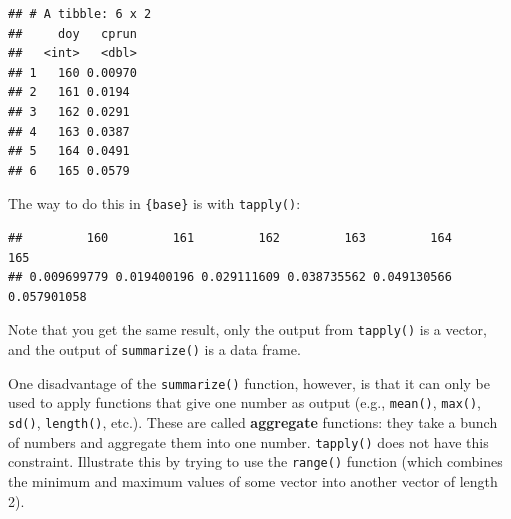 \documentclass[]{book}
\newenvironment{Shaded}{\begin{snugshade}}{\end{snugshade}}
\newcommand{\CommentTok}[1]{\textcolor[rgb]{0.56,0.35,0.01}{\textit{#1}}}
\newcommand{\DataTypeTok}[1]{\textcolor[rgb]{0.13,0.29,0.53}{#1}}
\newcommand{\DecValTok}[1]{\textcolor[rgb]{0.00,0.00,0.81}{#1}}
\newcommand{\KeywordTok}[1]{\textcolor[rgb]{0.13,0.29,0.53}{\textbf{#1}}}
\newcommand{\NormalTok}[1]{#1}
\newcommand{\OperatorTok}[1]{\textcolor[rgb]{0.81,0.36,0.00}{\textbf{#1}}}
\newcommand{\StringTok}[1]{\textcolor[rgb]{0.31,0.60,0.02}{#1}}
\begin{document}
\begin{Shaded}
\end{Shaded}

\begin{verbatim}
## # A tibble: 6 x 2
##     doy   cprun
##   <int>   <dbl>
## 1   160 0.00970
## 2   161 0.0194 
## 3   162 0.0291 
## 4   163 0.0387 
## 5   164 0.0491 
## 6   165 0.0579
\end{verbatim}

The way to do this in \texttt{\{base\}} is with \texttt{tapply()}:

\begin{Shaded}
\end{Shaded}

\begin{verbatim}
##         160         161         162         163         164         165 
## 0.009699779 0.019400196 0.029111609 0.038735562 0.049130566 0.057901058
\end{verbatim}

Note that you get the same result, only the output from \texttt{tapply()} is a vector, and the output of \texttt{summarize()} is a data frame.

One disadvantage of the \texttt{summarize()} function, however, is that it can only be used to apply functions that give one number as output (e.g., \texttt{mean()}, \texttt{max()}, \texttt{sd()}, \texttt{length()}, etc.). These are called \textbf{aggregate} functions: they take a bunch of numbers and aggregate them into one number. \texttt{tapply()} does not have this constraint. Illustrate this by trying to use the \texttt{range()} function (which combines the minimum and maximum values of some vector into another vector of length 2).

\begin{Shaded}
\end{Shaded}
\end{document}
